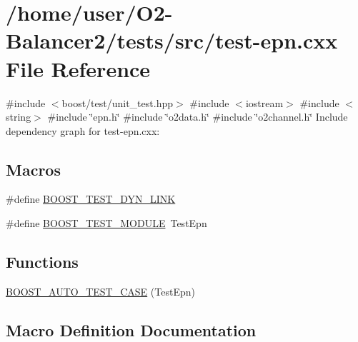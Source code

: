 \hypertarget{test-epn_8cxx}{}\section{/home/user/\+O2-\/\+Balancer2/tests/src/test-\/epn.cxx File Reference}
\label{test-epn_8cxx}
{\ttfamily \#include $<$boost/test/unit\+\_\+test.\+hpp$>$}\newline
{\ttfamily \#include $<$iostream$>$}\newline
{\ttfamily \#include $<$string$>$}\newline
{\ttfamily \#include \char`\"{}epn.\+h\char`\"{}}\newline
{\ttfamily \#include \char`\"{}o2data.\+h\char`\"{}}\newline
{\ttfamily \#include \char`\"{}o2channel.\+h\char`\"{}}\newline
Include dependency graph for test-\/epn.cxx\+:
\subsection*{Macros}
\begin{DoxyCompactItemize}
\item 
\#define \hyperlink{test-epn_8cxx_a139f00d2466d591f60b8d6a73c8273f1}{B\+O\+O\+S\+T\+\_\+\+T\+E\+S\+T\+\_\+\+D\+Y\+N\+\_\+\+L\+I\+NK}
\item 
\#define \hyperlink{test-epn_8cxx_a6b2a3852db8bb19ab6909bac01859985}{B\+O\+O\+S\+T\+\_\+\+T\+E\+S\+T\+\_\+\+M\+O\+D\+U\+LE}~Test\+Epn
\end{DoxyCompactItemize}
\subsection*{Functions}
\begin{DoxyCompactItemize}
\item 
\hyperlink{test-epn_8cxx_abe1b9f5c9305a3ce6ddb742be4854be8}{B\+O\+O\+S\+T\+\_\+\+A\+U\+T\+O\+\_\+\+T\+E\+S\+T\+\_\+\+C\+A\+SE} (Test\+Epn)
\end{DoxyCompactItemize}


\subsection{Macro Definition Documentation}
\mbox{\label{test-epn_8cxx_a139f00d2466d591f60b8d6a73c8273f1}} 
